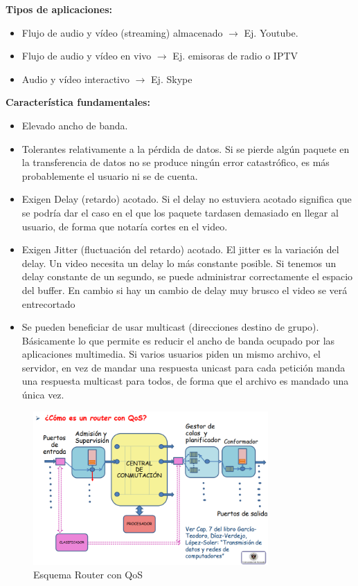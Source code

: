 \documentclass[a4paper,11pt]{article}
\begin{document}
\textbf{Tipos de aplicaciones:}

\begin{itemize}
\item Flujo de audio y vídeo (streaming) almacenado $\rightarrow$ Ej. Youtube.
\item Flujo de audio y vídeo en vivo $\rightarrow$ Ej. emisoras de radio o IPTV
\item Audio y vídeo interactivo $\rightarrow$ Ej. Skype
\end{itemize}

\textbf{Característica fundamentales:}

\begin{itemize}
\item Elevado ancho de banda.
\item Tolerantes relativamente a la pérdida de datos. Si se pierde algún paquete en la transferencia de datos no se produce ningún error catastrófico, es más probablemente el usuario ni se de cuenta.
\item Exigen Delay (retardo) acotado. Si el delay no estuviera acotado significa que se podría dar el caso en el que los paquete tardasen demasiado en llegar al usuario, de forma que notaría cortes en el video.
\item Exigen Jitter (fluctuación del retardo) acotado. El jitter es la variación del delay. Un video necesita un delay lo más constante posible. Si tenemos un delay constante de un segundo, se puede administrar correctamente el espacio del buffer. En cambio si hay un cambio de delay muy brusco el video se verá entrecortado
\item Se pueden beneficiar de usar multicast (direcciones destino de grupo). Básicamente lo que permite es reducir el ancho de banda ocupado por las aplicaciones multimedia. Si varios usuarios piden un mismo archivo, el servidor, en vez de mandar una respuesta unicast para cada petición manda una respuesta multicast para todos, de forma que el archivo es mandado una única vez.
\end{itemize}

\begin{figure}[h]
\centering
\caption{Esquema Router con QoS}
\includegraphics[scale=1,width=0.8\textwidth]{router_qos.png}
\end{figure}
\end{document}
